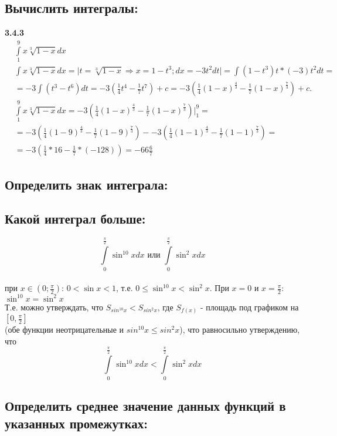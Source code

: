 \documentclass[a4paper, 12pt]{article}
\begin{document}
    \subsection{Вычислить интегралы:}
    
    \textbf{3.4.3}
    \begin{align*}
    &\int\limits_1^9x\sqrt[3]{1-x}dx \\
    &\int x\sqrt[3]{1-x}dx = \Big| t = \sqrt[3]{1-x} \Rightarrow x = 1-t^3; dx = -3t^2dt \Big| = 
    \int{(1-t^3)t*(-3)t^2dt} = \\
    &= -3\int(t^3-t^6)dt = -3(\frac{1}{4}t^4 - \frac{1}{7}t^7)+c = 
    -3\left(\frac{1}{4}(1-x)^\frac{4}{3} - \frac{1}{7}(1-x)^\frac{7}{3}\right)+c .\\
    & \int\limits_1^9x\sqrt[3]{1-x}dx = 
    -3\left(\frac{1}{4}(1-x)^\frac{4}{3} - \frac{1}{7}(1-x)^\frac{7}{3}\right)\Big|_1^9 = \\
    &= -3\left(\frac{1}{4}(1-9)^\frac{4}{3} - \frac{1}{7}(1-9)^\frac{7}{3}\right) - 
    -3\left(\frac{1}{4}(1-1)^\frac{4}{3} - \frac{1}{7}(1-1)^\frac{7}{3}\right) = \\
    &= -3\left(\frac{1}{4}*16 - \frac{1}{7}*(-128)\right) = 
    -66\frac{6}{7}
    \end{align*}
    
    \subsection{Определить знак интеграла:}
    
    \subsection{Какой интеграл больше:}
    $$\int\limits_0^{\frac{\pi}{2}}\sin^{10}xdx \text{ или } 
    \int\limits_0^{\frac{\pi}{2}}\sin^{2}xdx$$ \\
    при $x \in \left(0; \frac{\pi}{2}\right) $: 
    $ 0 < \sin x < 1 $, т.е. 
    $0 \leq \sin^{10}x < \sin^2 x $. При $x=0$ и $x=\frac{\pi}{2}$: 
    $\sin^{10}x = \sin^2x $ \\
    Т.е. можно утверждать, что $S_{sin^{10}x} < S_{sin^2x}$, где 
    $S_{f(x)} $ - площадь под графиком на $[0, \frac{\pi}{2}]$ \\
    (обе функции неотрицательные и $sin^{10}x \leq sin^2x$), что равносильно утверждению, что
    $$\int\limits_0^{\frac{\pi}{2}}\sin^{10}xdx < 
    \int\limits_0^{\frac{\pi}{2}}\sin^{2}xdx$$
    
    \subsection{Определить среднее значение данных функций в указанных промежутках:}
    
\end{document}
